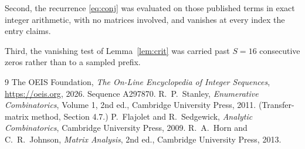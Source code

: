 \documentclass[11pt,a4paper]{article}
\theoremstyle{plain}
\theoremstyle{definition}
\begin{document}
Second, the recurrence \eqref{eq:conj} was evaluated on those published terms in exact
integer arithmetic, with no matrices involved, and vanishes at every index the entry claims.

Third, the vanishing test of Lemma~\ref{lem:crit} was carried past $S=16$ consecutive
zeros rather than to a sampled prefix.

\begin{thebibliography}{9}
 The OEIS Foundation, \emph{The On-Line Encyclopedia of Integer
Sequences}, \url{https://oeis.org}, 2026. Sequence A297870.
 R.~P.~Stanley, \emph{Enumerative Combinatorics}, Volume 1, 2nd ed.,
Cambridge University Press, 2011. (Transfer-matrix method, Section 4.7.)
 P.~Flajolet and R.~Sedgewick, \emph{Analytic Combinatorics}, Cambridge
University Press, 2009.
 R.~A.~Horn and C.~R.~Johnson, \emph{Matrix Analysis}, 2nd ed., Cambridge
University Press, 2013.
\end{thebibliography}
\end{document}

